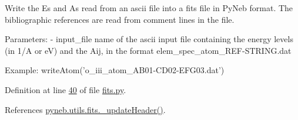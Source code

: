 \begin{DoxyVerb}Write the Es and As read from an ascii file into a fits file in PyNeb format.
The bibliographic references are read from comment lines in the file.
    
Parameters:
    - input_file    name of the ascii input file containing the energy levels (in 1/A or eV) and the Aij,
                    in the format elem_spec_atom_REF-STRING.dat

Example: 
writeAtom('o_iii_atom_AB01-CD02-EFG03.dat')\end{DoxyVerb}
 

Definition at line \hyperlink{fits_8py_source_l00040}{40} of file \hyperlink{fits_8py_source}{fits.\-py}.



References \hyperlink{fits_8py_source_l00015}{pyneb.\-utils.\-fits.\-\_\-update\-Header()}.


